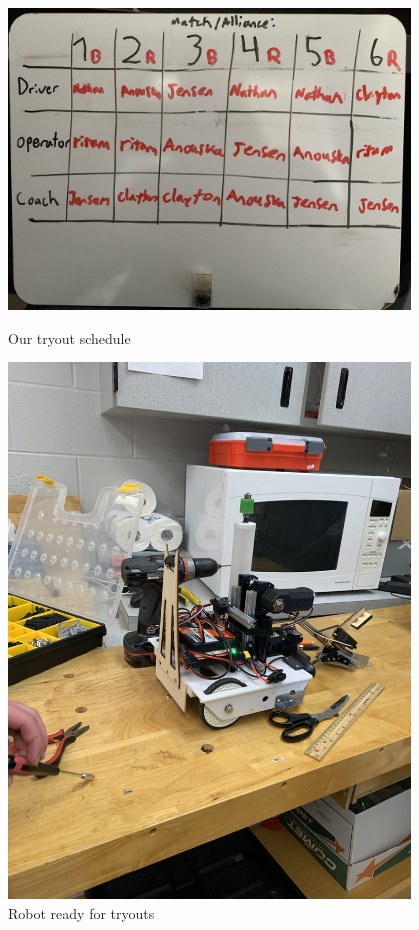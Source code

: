  

\begin{figure}[ht]
\centering
\begin{minipage}[b]{.48\textwidth}
  \centering
  \includegraphics[width=0.95\textwidth]{Meetings/November/11-04-21/11-4-21_Team_Figure1 - Nathan Forrer.JPG}
  \caption{Our tryout schedule}
  \label{fig:pic1}
\end{minipage}%
\hfill%
\begin{minipage}[b]{.48\textwidth}
  \centering
  \includegraphics[width=0.95\textwidth]{Meetings/November/11-04-21/11-4-21_Team_Figure2 - Nathan Forrer.JPG}
  \caption{Robot ready for tryouts}
  \label{fig:pic2}
\end{minipage}
\end{figure}

